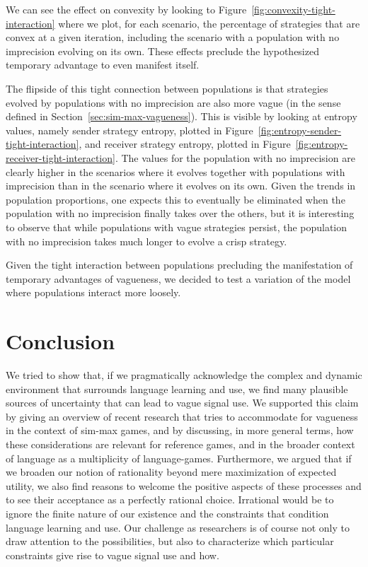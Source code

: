 \documentclass[a4paper]{article}
\begin{document}
We can see the effect on convexity by looking to Figure~\ref{fig:convexity-tight-interaction} where we plot, for each scenario, the percentage of strategies that are convex at a given iteration, including the scenario with a population with no imprecision evolving on its own.
These effects preclude the hypothesized temporary advantage to even manifest itself.

The flipside of this tight connection between populations is that strategies evolved by populations with no imprecision are also more vague (in the sense defined in Section~\ref{sec:sim-max-vagueness}).
This is visible by looking at entropy values, namely sender strategy entropy, plotted in Figure~\ref{fig:entropy-sender-tight-interaction}, and receiver strategy entropy, plotted in Figure~\ref{fig:entropy-receiver-tight-interaction}.
The values for the population with no imprecision are clearly higher in the scenarios where it evolves together with populations with imprecision than in the scenario where it evolves on its own.
Given the trends in population proportions, one expects this to eventually be eliminated when the population with no imprecision finally takes over the others, but it is interesting to observe that while populations with vague strategies persist, the population with no imprecision takes much longer to evolve a crisp strategy.

Given the tight interaction between populations precluding the manifestation of temporary advantages of vagueness, we decided to test a variation of the model where populations interact more loosely.

\section{Conclusion}
\label{sec:conclusion}

We tried to show that, if we pragmatically acknowledge the complex and dynamic environment that surrounds language learning and use, we find many plausible sources of uncertainty that can lead to vague signal use.
We supported this claim by giving an overview of recent research that tries to accommodate for vagueness in the context of sim-max games, and by discussing, in more general terms, how these considerations are relevant for reference games, and in the broader context of language as a multiplicity of language-games.
Furthermore, we argued that if we broaden our notion of rationality beyond mere maximization of expected utility, we also find reasons to welcome the positive aspects of these processes and to see their acceptance as a perfectly rational choice.
Irrational would be to ignore the finite nature of our existence and the constraints that condition language learning and use.
Our challenge as researchers is of course not only to draw attention to the possibilities, but also to characterize which particular constraints give rise to vague signal use and how.
\end{document}
